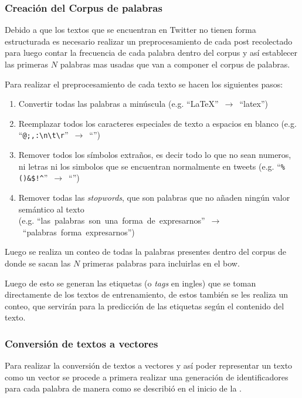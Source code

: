 \subsubsection{Creación del Corpus de palabras}
Debido a que los textos que se encuentran en Twitter no tienen forma estructurada es necesario realizar un preprocesamiento de cada post recolectado para luego contar la frecuencia de cada palabra dentro del corpus y así establecer las primeras $N$ palabras mas usadas que van a componer el corpus de palabras.

Para realizar el preprocesamiento de cada texto se hacen los siguientes pasos:
\begin{enumerate}
\item Convertir todas las palabras a minúscula (e.g. \mbox{``LaTeX'' $\rightarrow$ ``latex''})
\item Reemplazar todos los caracteres especiales de texto a espacios en blanco (e.g. \mbox{``\texttt{@;,:\textbackslash n\textbackslash t\textbackslash r}'' $\rightarrow$ ``\textvisiblespace \textvisiblespace \textvisiblespace \textvisiblespace \textvisiblespace \textvisiblespace \textvisiblespace''})
\item Remover todos los símbolos extraños, es decir todo lo que no sean numeros, ni letras ni los simbolos que se encuentran normalmente en tweets (e.g. \mbox{``\texttt{\%()\*\&\$!\^}'' $\rightarrow$ ``''})
\item Remover todas las \emph{stopwords}, que son palabras que no añaden ningún valor semántico al texto \\ (e.g. \mbox{``las palabras son una forma de expresarnos'' $\rightarrow$ ``palabras forma expresarnos''})
\end{enumerate}

Luego se realiza un conteo de todas la palabras presentes dentro del corpus de donde se sacan las $N$ primeras palabras para incluirlas en el \gls{bow}.

Luego de esto se generan las etiquetas (o \emph{tags} en ingles) que se toman directamente de los textos de entrenamiento, de estos también se les realiza un conteo, que servirán para la predicción de las etiquetas según el contenido del texto.

\subsubsection{Conversión de textos a vectores}
Para realizar la conversión de textos a vectores y así poder representar un texto como un vector se procede a primera realizar una generación de identificadores para cada palabra de manera como se describió en el inicio de la .

